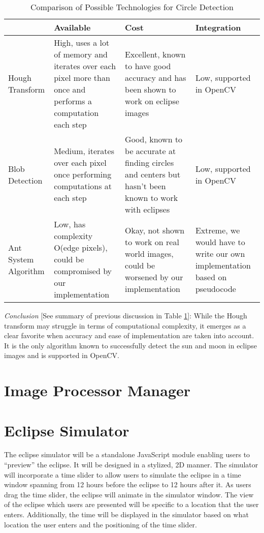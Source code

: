 \documentclass[10pt, onecolumn, draftclsnofoot, letterpaper, compsoc]{IEEEtran}
\begin{document}
\begin{table}[h]
\centering
\caption{Comparison of Possible Technologies for Circle Detection}
\begin{tabular}{|p{3.15cm}|p{3.15cm}|p{3.15cm}|p{3.15cm}|}
\cline{4-4}

\hline  & Available & Cost & Integration \\ \hline

Hough Transform & High, uses a lot of memory and iterates over each pixel more
than once and performs a computation each step & Excellent, known to have good
accuracy and has been shown to work on eclipse images & Low, supported in OpenCV
\\ \hline

Blob Detection & Medium, iterates over each pixel once performing computations at each step & Good, known to be accurate at finding circles and centers but hasn’t been known to work with eclipses & Low, supported in OpenCV
\\ \hline


Ant System Algorithm & Low, has complexity O(edge pixels), could be compromised by our implementation & Okay, not shown to work on real world images, could be worsened by our implementation & Extreme, we would have to write our own implementation based on pseudocode
\\ \hline

\end{tabular}
\label{table:george3}
\end{table}

\textit{Conclusion} [See summary of previous discussion in Table
\ref{table:george3}]: While the Hough transform may struggle in terms of computational
complexity, it emerges as a clear favorite when accuracy and ease of
implementation are taken into account. It is the only algorithm known to
successfully detect the sun and moon in eclipse images and is supported in
OpenCV.

\section{Image Processor Manager}

\section{Eclipse Simulator}
The eclipse simulator will be a standalone JavaScript module enabling users to
“preview” the eclipse. It will be designed in a stylized, 2D manner.
The simulator will incorporate a time slider to allow users to simulate
the eclipse in a time window spanning from 12 hours before the eclipse to 12
hours after it. As users drag the time slider, the eclipse will animate in the
simulator window. The view of the eclipse which users are presented will be 
specific to a location that the user enters. Additionally, the time will be
displayed in the simulator based on what location the user enters and the
positioning of the time slider.



\end{document}
